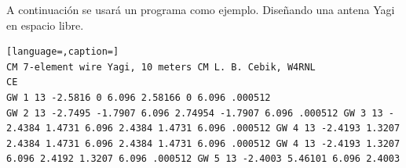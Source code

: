 \documentclass[12pt]{article}
\begin{document}
A continuaci\'on se usar\'a un programa como ejemplo. Diseñando una antena Yagi en espacio libre.

\begin{lstlisting}[language=,caption=]
CM 7-element wire Yagi, 10 meters CM L. B. Cebik, W4RNL
CE
GW 1 13 -2.5816 0 6.096 2.58166 0 6.096 .000512
GW 2 13 -2.7495 -1.7907 6.096 2.74954 -1.7907 6.096 .000512 GW 3 13 -
2.4384 1.4731 6.096 2.4384 1.4731 6.096 .000512 GW 4 13 -2.4193 1.3207
2.4384 1.4731 6.096 2.4384 1.4731 6.096 .000512 GW 4 13 -2.4193 1.3207
6.096 2.4192 1.3207 6.096 .000512 GW 5 13 -2.4003 5.46101 6.096 2.4003
\end{lstlisting}
\end{document}
